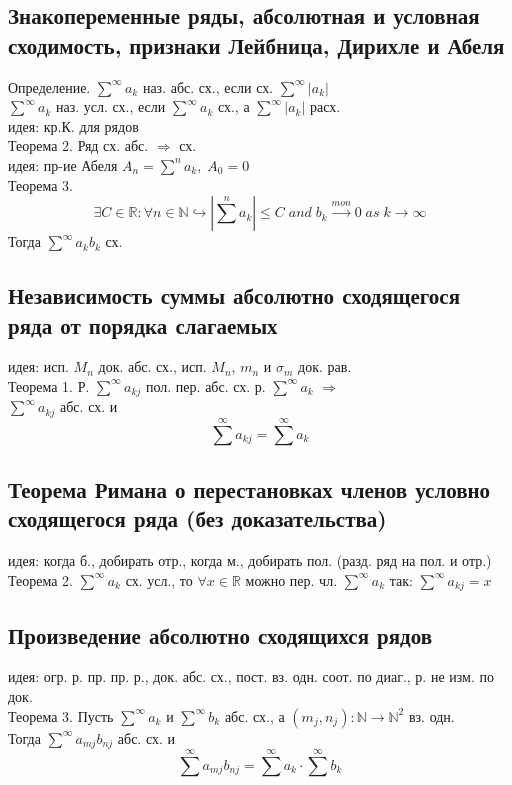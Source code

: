 \documentclass{article}
\begin{document}
\subsection{Знакопеременные ряды, абсолютная и условная сходимость, признаки Лейбница, Дирихле и Абеля}
Определение. $\overset{\infty}{\sum} a_k$ наз. абс. сх., если сх. $\overset{\infty}{\sum} |a_k|$ \\
$\overset{\infty}{\sum} a_k$ наз. усл. сх., если $\overset{\infty}{\sum} a_k$ сх., а $\overset{\infty}{\sum} |a_k|$ расх. \\
идея: кр.К. для рядов \\
Теорема 2. Ряд сх. абс. $\Rightarrow$ сх. \\
идея: пр-ие Абеля $A_n = \overset{n}{\sum} a_k, \; A_0 = 0 $ \\
Теорема 3.
\begin{equation*}
    \exists C \in \mathbb R: \forall n \in \mathbb N \hookrightarrow |\overset{n}{\sum} a_k| \leq C \; and \; b_k \overset{mon}{\rightarrow} 0 \; as \; k \rightarrow \infty
\end{equation*}
Тогда $\overset{\infty}{\sum} a_k b_k$ сх.
\subsection{Независимость суммы абсолютно сходящегося ряда от порядка слагаемых}
идея: исп. $M_n$ док. абс. сх., исп. $M_n$, $m_n$ и $\sigma_m$ док. рав. \\
Теорема 1. Р. $\sum^\infty a_{kj}$ пол. пер. абс. сх. р. $\sum^\infty a_{k}$ $\Rightarrow$ \\
$\sum^\infty a_{kj}$ абс. сх. и
\begin{equation*}
    \sum^\infty a_{kj} = \sum^\infty a_{k}
\end{equation*}
\subsection{Теорема Римана о перестановках
членов условно сходящегося ряда (без доказательства)}
идея: когда б., добирать отр., когда м., добирать пол. (разд. ряд на пол. и отр.) \\
Теорема 2. $\overset{\infty}{\sum} a_k$ сх. усл., то $\forall x \in \mathbb R$ можно пер. чл. $\overset{\infty}{\sum} a_k$ так: $\overset{\infty}{\sum} a_{kj} = x$
\subsection{Произведение абсолютно сходящихся рядов}
идея: огр. р. пр. пр. р., док. абс. сх., пост. вз. одн. соот. по диаг., р. не изм. по док. \\
Теорема 3. Пусть $\sum^\infty a_k$ и $\sum^\infty b_k$ абс. сх., а ${(m_j, n_j)}: \mathbb N \rightarrow \mathbb N ^2 $ вз. одн. \\
Тогда $\sum^\infty a_{mj}b_{nj}$ абс. сх. и
\begin{equation*}
    \sum^\infty a_{mj}b_{nj} = \sum^\infty a_k \cdot \sum^\infty b_k
\end{equation*}
\end{document}
